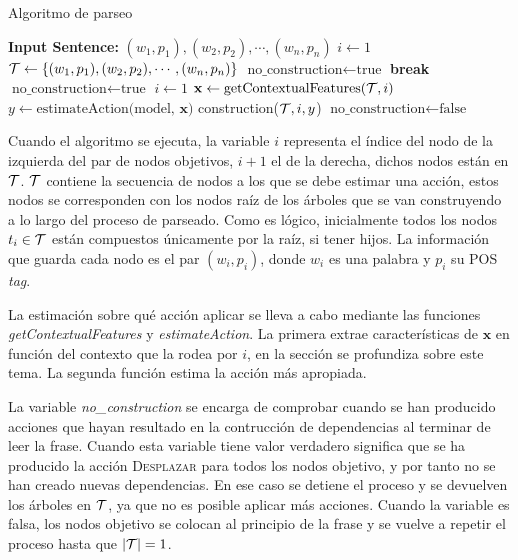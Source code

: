 \begin{algorithm}[ht]
  \caption{Algoritmo de parseo}
  \label{algorithm:parsing}

  
  \begin{algorithmic}[1] %
    \State \textbf{Input Sentence:} $(w_1, p_1),(w_2,p_2),\cdots,(w_n,p_n)$
    \Init
       \State $i\gets 1$
       \State ${\cal T}\gets \{(w_1, p_1),(w_2,p_2),\cdots,(w_n,p_n)\}$
       \State $\text{no\_construction}\gets \text{true}$
    \EndInit
    \Start
                \textbf{break}
             \EndIf
             \State $\text{no\_construction}\gets \text{true}$
             \State $i\gets 1$
          \Else
             \State $\mathbf{x}\gets \text{getContextualFeatures(${\cal T}, i$)} $
             \State $y\gets \text{estimateAction(model, $\mathbf{x}$)}$
             \State construction(${\cal T}, i, y$)
                $\text{no\_construction}\gets \text{false}$
             \EndIf
          \EndIf
       \EndWhile
    \EndStart
    \end{algorithmic}
\end{algorithm}

Cuando el algoritmo se ejecuta, la variable $i$ representa el índice del nodo de
la izquierda del par de nodos objetivos, $i + 1$ el de la derecha, dichos nodos
están en ${\cal T}$. ${\cal T}$ contiene la secuencia de nodos a los que se debe
estimar una acción, estos nodos se corresponden con los nodos raíz de los
árboles que se van construyendo a lo largo del proceso de parseado. Como es
lógico, inicialmente todos los nodos $t_i\in {\cal T}$ están compuestos
únicamente por la raíz, si tener hijos. La información que guarda cada nodo es
el par $(w_i, p_i)$, donde $w_i$ es una palabra y $p_i$ su \ac{POS} \emph{tag}.

La estimación sobre qué acción aplicar se lleva a cabo mediante las funciones
\emph{getContextualFeatures} y \emph{estimateAction}. La primera extrae
características de $\mathbf{x}$ en función del contexto que la rodea por $i$, en
la sección  se profundiza sobre este tema. La
segunda función estima la acción más apropiada.

La variable \emph{no\_construction} se encarga de comprobar cuando se han
producido acciones que hayan resultado en la contrucción de dependencias al
terminar de leer la frase. Cuando esta variable tiene valor verdadero significa
que se ha producido la acción \textsc{Desplazar} para todos los nodos objetivo,
y por tanto no se han creado nuevas dependencias. En ese caso se detiene el
proceso y se devuelven los árboles en ${\cal T}$, ya que no es posible aplicar
más acciones. Cuando la variable es falsa, los nodos objetivo se colocan al
principio de la frase y se vuelve a repetir el proceso hasta que $|{\cal T}| = 1$.

